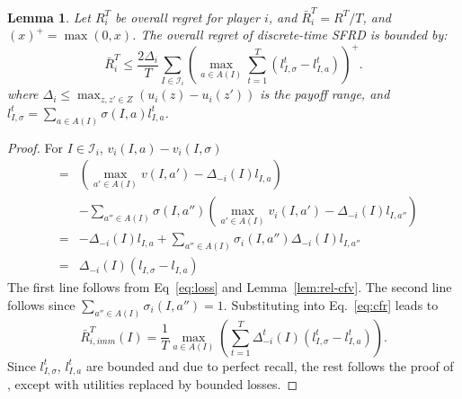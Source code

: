 \documentclass{aamas2014}
\newcommand{\cI}{\mathcal{I}}
\newtheorem{lemma}{Lemma}
\begin{document}
\begin{lemma}
\label{lem:cfr}
Let $R^T_i$ be overall regret for player $i$, and $\bar{R}^T_i = R^T / T$, and $(x)^+ = \max(0,x)$. The overall regret of  
discrete-time SFRD is bounded by: 
\[
\bar{R}^T_i \le \frac{2 \Delta_i}{T} \sum_{ I \in \cI_i} \left( \max_{a \in A(I)} \sum_{t=1}^T ( l^t_{I,\sigma} - l^t_{I,a}) \right)^+. 
\]
where $\Delta_i \le \max_{z,z' \in Z} ( u_i(z) - u_i(z') )$ is the payoff range, 
and $l^t_{I,\sigma} = \sum_{a \in A(I)} \sigma(I,a) l^t_{I,a}$.
\end{lemma}
\begin{proof}
For $I \in \cI_i$, $v_i(I,a) - v_i(I,\sigma)$
\begin{eqnarray*}
 & = &   (\max_{a' \in A(I)} v(I,a') - \Delta_{-i}(I) l_{I,a})\\
 &   & - \sum_{a'' \in A(I)} \sigma(I,a'') \left( \max_{a' \in A(I)} v_i(I,a') - \Delta_{-i}(I) l_{I,a''} \right) \\ 
 & = & - \Delta_{-i}(I) l_{I,a} + \sum_{a'' \in A(I)} \sigma_i(I,a'') \Delta_{-i}(I) l_{I,a''}\\
 & = & \Delta_{-i}(I) ( l_{I,\sigma} - l_{I,a} ) 
\end{eqnarray*}
The first line follows from Eq~\ref{eq:loss} and Lemma~\ref{lem:rel-cfv}.
The second line follows since $\sum_{a'' \in A(I)} \sigma_i(I,a'') = 1$. Substituting into Eq.~\ref{eq:cfr} leads to
\begin{equation}
\label{eq:pw-immreg}
\bar{R}^T_{i,imm}(I)  =  \frac{1}{T} \max_{a \in A(I)} \left( \sum_{t=1}^T \Delta^t_{-i}(I) (l^t_{I,\sigma} - l^t_{I,a}) \right). 
\end{equation}
Since $l^t_{I,\sigma}$, $l^t_{I,a}$ are bounded and due to perfect recall, the rest follows  
the proof of \cite[Theorem 3]{CFR}, except with utilities replaced by bounded losses. 
\end{proof}
\end{document}

